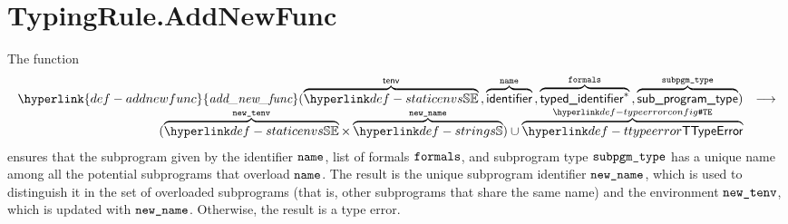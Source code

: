 \documentclass{book}
\newcommand\ProseOtherwiseTypeError[0]{Otherwise, the result is a type error.}
\newcommand\addnewfunc[0]{\hyperlink{def-addnewfunc}{\textfunc{add\_new\_func}}}
\begin{document}
\section{TypingRule.AddNewFunc \label{sec:TypingRule.AddNewFunc}}
\hypertarget{def-addnewfunc}{}
The function
\[
  \begin{array}{rl}
  \addnewfunc(
    \overname{\staticenvs}{\tenv} \aslsep
    \overname{\identifier}{\name} \aslsep
    \overname{\typedidentifier^*}{\formals} \aslsep
    \overname{\subprogramtype}{\subpgmtype})
  & \aslto\\
  (\overname{\staticenvs}{\newtenv} \times \overname{\Strings}{\newname})
  \cup \overname{\TTypeError}{\TypeErrorConfig} &
  \end{array}
\]
ensures that the subprogram given by the identifier $\texttt{name}$, list of formals $\texttt{formals}$,
and subprogram type $\texttt{subpgm\_type}$ has a unique name among all the potential subprograms
that overload $\texttt{name}$.
The result is the unique subprogram identifier $\texttt{new\_name}$, which is used to distinguish it in the set
of overloaded subprograms (that is, other subprograms that share the same name)
and the environment $\texttt{new\_tenv}$, which is updated with $\texttt{new\_name}$.
\ProseOtherwiseTypeError
\end{document}
